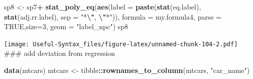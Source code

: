 \documentclass[
]{article}
\newenvironment{Shaded}{\begin{snugshade}}{\end{snugshade}}
\newcommand{\AttributeTok}[1]{\textcolor[rgb]{0.13,0.29,0.53}{#1}}
\newcommand{\ConstantTok}[1]{\textcolor[rgb]{0.56,0.35,0.01}{#1}}
\newcommand{\DecValTok}[1]{\textcolor[rgb]{0.00,0.00,0.81}{#1}}
\newcommand{\FunctionTok}[1]{\textcolor[rgb]{0.13,0.29,0.53}{\textbf{#1}}}
\newcommand{\NormalTok}[1]{#1}
\newcommand{\OtherTok}[1]{\textcolor[rgb]{0.56,0.35,0.01}{#1}}
\newcommand{\SpecialCharTok}[1]{\textcolor[rgb]{0.81,0.36,0.00}{\textbf{#1}}}
\newcommand{\StringTok}[1]{\textcolor[rgb]{0.31,0.60,0.02}{#1}}
\begin{document}
\begin{Shaded}
\begin{Highlighting}[]
\NormalTok{sp8 }\OtherTok{\textless{}{-}}\NormalTok{ sp7}\SpecialCharTok{+}
  \FunctionTok{stat\_poly\_eq}\NormalTok{(}\FunctionTok{aes}\NormalTok{(}\AttributeTok{label =}  \FunctionTok{paste}\NormalTok{(}\FunctionTok{stat}\NormalTok{(eq.label),}
                                  \FunctionTok{stat}\NormalTok{(adj.rr.label), }\AttributeTok{sep =} \StringTok{"*}\SpecialCharTok{\textbackslash{}"}\StringTok{, }\SpecialCharTok{\textbackslash{}"}\StringTok{*"}\NormalTok{)),}
               \AttributeTok{formula =}\NormalTok{ my.formula4, }\AttributeTok{parse =} \ConstantTok{TRUE}\NormalTok{,}\AttributeTok{size=}\DecValTok{3}\NormalTok{,  }\AttributeTok{geom =} \StringTok{"label\_npc"}\NormalTok{)}
\NormalTok{sp8}
\end{Highlighting}
\end{Shaded}

\texttt{[image: Useful-Syntax\_files/figure-latex/unnamed-chunk-104-2.pdf]}
\#\#\# add deviation from regression

\begin{Shaded}
\begin{Highlighting}[]
\FunctionTok{data}\NormalTok{(mtcars)}
\NormalTok{mtcars }\OtherTok{\textless{}{-}}\NormalTok{ tibble}\SpecialCharTok{::}\FunctionTok{rownames\_to\_column}\NormalTok{(mtcars, }\StringTok{"car\_name"}\NormalTok{)}
\end{Highlighting}
\end{Shaded}
\end{document}
